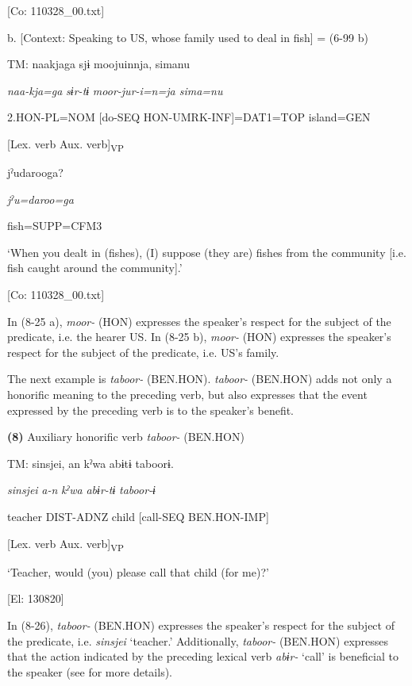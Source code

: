       [Co: 110328\_00.txt]

  b.  [Context: Speaking to US, whose family used to deal in fish] = (6-99 b)

    TM:  naakjaga  sjɨ  moojuinnja,  simanu

      \textit{naa-kja=ga}  \textit{sɨr-tɨ}  \textit{moor{}-jur-i=n=ja  sima=nu}

      2.HON-PL=NOM  [do-SEQ  HON-UMRK-INF]=DAT1=TOP  island=GEN

        [Lex. verb  Aux. verb]\textsubscript{VP}  

      jˀudarooga?

      \textit{jˀu=daroo=ga}

      fish=SUPP=CFM3

      ‘When you dealt in (fishes), (I) suppose (they are) fishes from the community [i.e. fish caught around the community].’

      [Co: 110328\_00.txt]

In (8-25 a), \textit{moor-} (HON) expresses the speaker’s respect for the subject of the predicate, i.e. the hearer US. In (8-25 b), \textit{moor-} (HON) expresses the speaker’s respect for the subject of the predicate, i.e. US’s family.

  The next example is \textit{taboor-} (BEN.HON). \textit{taboor-} (BEN.HON) adds not only a honorific meaning to the preceding verb, but also expresses that the event expressed by the preceding verb is to the speaker’s benefit.

\textbf{(8)}  Auxiliary honorific verb \textit{taboor-} (BEN.HON)

  TM:  {\textbar}sinsjei{\textbar},  an  kˀwa  abɨtɨ  taboorɨ.

    \textit{sinsjei}  \textit{a-n}  \textit{kˀwa}  \textit{abɨr-tɨ}  \textit{taboor{}-ɨ}

    teacher  DIST-ADNZ  child  [call-SEQ  BEN.HON-IMP]

          [Lex. verb  Aux. verb]\textsubscript{VP}

    ‘Teacher, would (you) please call that child (for me)?’

    [El: 130820]

In (8-26), \textit{taboor-} (BEN.HON) expresses the speaker’s respect for the subject of the predicate, i.e. \textit{sinsjei} ‘teacher.’ Additionally, \textit{taboor-} (BEN.HON) expresses that the action indicated by the preceding lexical verb \textit{abɨr-} ‘call’ is beneficial to the speaker (see  for more details).

